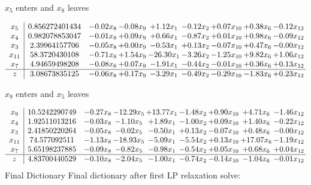 \documentclass[8pt]{article}
\begin{document}
 $ x_{5} $ enters and $ x_{8} $ leaves 

 \[\begin{array}{c| c c@{\hskip 2pt} c@{\hskip 2pt} c@{\hskip 2pt} c@{\hskip 2pt} c@{\hskip 2pt} c@{\hskip 2pt} c@{\hskip 2pt} }
 x_{5}   &  0.856272401434 & -0.02 x_{8} & -0.08 x_{9} & +  1.12 x_{1} & -0.12 x_{2} & +  0.07 x_{10} & +  0.38 x_{6} & -0.12 x_{12}\\
 x_{4}   &  0.982078853047 & -0.01 x_{8} & +  0.09 x_{9} & +  0.66 x_{1} & -0.87 x_{2} & +  0.01 x_{10} & +  0.98 x_{6} & -0.09 x_{12}\\
 x_{3}   &  2.39964157706 & -0.05 x_{8} & +  0.00 x_{9} & -0.53 x_{1} & +  0.13 x_{2} & -0.07 x_{10} & +  0.47 x_{6} & -0.00 x_{12}\\
 x_{11}   &  58.3720430108 & -0.71 x_{8} & +  1.54 x_{9} & -26.30 x_{1} & -3.26 x_{2} & -1.25 x_{10} & +  9.82 x_{6} & +  1.06 x_{12}\\
 x_{7}   &  4.94659498208 & -0.08 x_{8} & +  0.07 x_{9} & -1.91 x_{1} & -0.44 x_{2} & -0.01 x_{10} & +  0.36 x_{6} & +  0.13 x_{12}\\
\hline
z    &  3.08673835125 & -0.06 x_{8} & +  0.17 x_{9} & -3.29 x_{1} & -0.49 x_{2} & -0.29 x_{10} & -1.83 x_{6} & +  0.23 x_{12}\\
\end{array}\]


 $ x_{9} $ enters and $ x_{5} $ leaves 

 \[\begin{array}{c| c c@{\hskip 2pt} c@{\hskip 2pt} c@{\hskip 2pt} c@{\hskip 2pt} c@{\hskip 2pt} c@{\hskip 2pt} c@{\hskip 2pt} }
 x_{9}   &  10.5242290749 & -0.27 x_{8} & -12.29 x_{5} & + 13.77 x_{1} & -1.48 x_{2} & +  0.90 x_{10} & +  4.71 x_{6} & -1.46 x_{12}\\
 x_{4}   &  1.92511013216 & -0.03 x_{8} & -1.10 x_{5} & +  1.89 x_{1} & -1.00 x_{2} & +  0.09 x_{10} & +  1.40 x_{6} & -0.22 x_{12}\\
 x_{3}   &  2.41850220264 & -0.05 x_{8} & -0.02 x_{5} & -0.50 x_{1} & +  0.13 x_{2} & -0.07 x_{10} & +  0.48 x_{6} & -0.00 x_{12}\\
 x_{11}   &  74.577092511 & -1.13 x_{8} & -18.93 x_{5} & -5.09 x_{1} & -5.54 x_{2} & +  0.13 x_{10} & + 17.07 x_{6} & -1.19 x_{12}\\
 x_{7}   &  5.65198237885 & -0.09 x_{8} & -0.82 x_{5} & -0.98 x_{1} & -0.54 x_{2} & +  0.05 x_{10} & +  0.68 x_{6} & +  0.04 x_{12}\\
\hline
z    &  4.83700440529 & -0.10 x_{8} & -2.04 x_{5} & -1.00 x_{1} & -0.74 x_{2} & -0.14 x_{10} & -1.04 x_{6} & -0.01 x_{12}\\
\end{array}\]
Final Dictionary
Final dictionary after first LP relaxation solve: 
\end{document}
